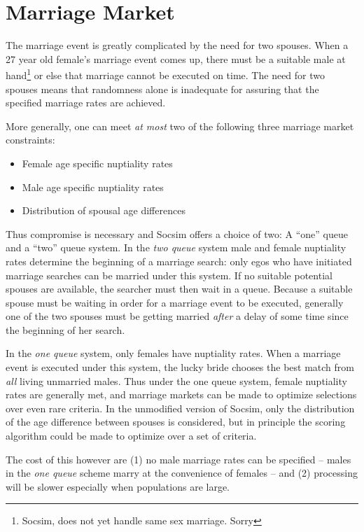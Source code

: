 
\section{Marriage Market}
\label{sec:marriageQueue}

The marriage event is greatly complicated by the need for two spouses.
When a 27 year old female's marriage event comes up, there must be a
suitable male at hand\footnote{Socsim, does not yet handle same sex
  marriage. Sorry} or else that marriage cannot be executed on
time. The need for two spouses means that randomness alone is
inadequate for assuring that the specified marriage rates are
achieved.

More generally, one can meet \emph{at most} two of the following three
marriage market constraints:

\begin{itemize}
\item Female age specific nuptiality rates
\item Male age specific nuptiality rates
\item Distribution of spousal age differences
\end{itemize}

Thus compromise is necessary and Socsim offers a choice of two: A
``one'' queue and a ``two'' queue system.  In the \emph{two queue} system
male and female nuptiality rates determine the beginning of a marriage
search: only egos who have initiated marriage searches can be married
under this system. If no suitable potential spouses are available, the
searcher must then wait in a queue. Because a suitable spouse must be
waiting in order for a marriage event to be executed, generally one of
the two spouses must be getting married \emph{after} a delay of some
time since the beginning of her search.  

In the \emph{one queue} system, only females have nuptiality rates.
When a marriage event is executed under this system, the lucky bride
chooses the best match from \emph{all} living unmarried males.  Thus
under the one queue system, female nuptiality rates are generally met,
and marriage markets can be made to optimize selections over even rare
criteria.  In the unmodified version of Socsim, only the distribution
of the age difference between spouses is considered, but in principle
the scoring algorithm could be made to optimize over a set of
criteria. 

The cost of this however are (1) no male marriage rates can
be specified -- males in the \emph{one queue} scheme marry at the
convenience of females -- and (2) processing will be slower especially when
populations are large.


